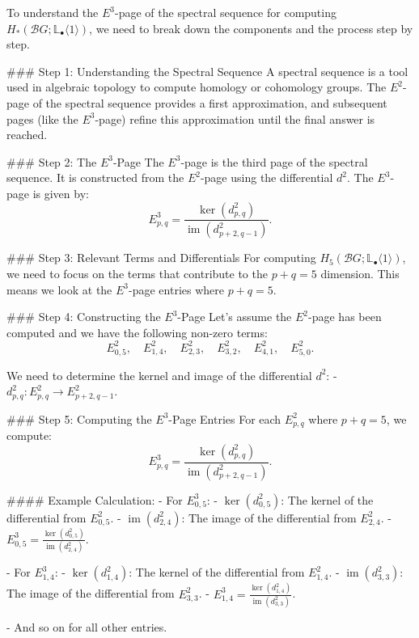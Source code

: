 To understand the \( E^3 \)-page of the spectral sequence for computing \( H_*(\mathcal{B}G; \mathbb{L}_\bullet\langle 1 \rangle) \), we need to break down the components and the process step by step.

### Step 1: Understanding the Spectral Sequence
A spectral sequence is a tool used in algebraic topology to compute homology or cohomology groups. The \( E^2 \)-page of the spectral sequence provides a first approximation, and subsequent pages (like the \( E^3 \)-page) refine this approximation until the final answer is reached.

### Step 2: The \( E^3 \)-Page
The \( E^3 \)-page is the third page of the spectral sequence. It is constructed from the \( E^2 \)-page using the differential \( d^2 \). The \( E^3 \)-page is given by:
\[ E^3_{p,q} = \frac{\ker(d^2_{p,q})}{\operatorname{im}(d^2_{p+2,q-1})}. \]

### Step 3: Relevant Terms and Differentials
For computing \( H_5(\mathcal{B}G; \mathbb{L}_\bullet\langle 1 \rangle) \), we need to focus on the terms that contribute to the \( p+q = 5 \) dimension. This means we look at the \( E^3 \)-page entries where \( p + q = 5 \).

### Step 4: Constructing the \( E^3 \)-Page
Let's assume the \( E^2 \)-page has been computed and we have the following non-zero terms:
\[ E^2_{0,5}, \quad E^2_{1,4}, \quad E^2_{2,3}, \quad E^2_{3,2}, \quad E^2_{4,1}, \quad E^2_{5,0}. \]

We need to determine the kernel and image of the differential \( d^2 \):
- \( d^2_{p,q} : E^2_{p,q} \to E^2_{p+2,q-1} \).

### Step 5: Computing the \( E^3 \)-Page Entries
For each \( E^2_{p,q} \) where \( p + q = 5 \), we compute:
\[ E^3_{p,q} = \frac{\ker(d^2_{p,q})}{\operatorname{im}(d^2_{p+2,q-1})}. \]

#### Example Calculation:
- For \( E^3_{0,5} \):
  - \( \ker(d^2_{0,5}) \): The kernel of the differential from \( E^2_{0,5} \).
  - \( \operatorname{im}(d^2_{2,4}) \): The image of the differential from \( E^2_{2,4} \).
  - \( E^3_{0,5} = \frac{\ker(d^2_{0,5})}{\operatorname{im}(d^2_{2,4})} \).

- For \( E^3_{1,4} \):
  - \( \ker(d^2_{1,4}) \): The kernel of the differential from \( E^2_{1,4} \).
  - \( \operatorname{im}(d^2_{3,3}) \): The image of the differential from \( E^2_{3,3} \).
  - \( E^3_{1,4} = \frac{\ker(d^2_{1,4})}{\operatorname{im}(d^2_{3,3})} \).

- And so on for all other entries.

